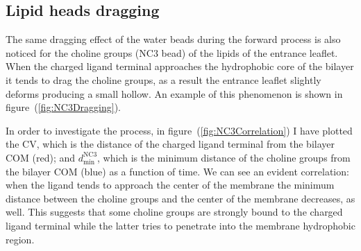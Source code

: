 \subsection{Lipid heads dragging}
The same dragging effect of the water beads during the forward process is also noticed for the choline groups 
(NC$3$ \martini{} bead) of the lipids of the entrance leaflet. When the charged ligand terminal approaches the 
hydrophobic core of the bilayer it tends to drag the choline groups, as a result the entrance leaflet slightly 
deforms producing a small hollow. An example of this phenomenon is shown in figure~(\ref{fig:NC3Dragging}).

In order to investigate the process, in figure~(\ref{fig:NC3Correlation}) I have plotted the \ac{CV}, which is the 
distance of the charged ligand terminal from the bilayer \ac{COM} (red); and $d_\text{min}^{\text{NC}3}$, which is 
the minimum distance of the choline groups from the bilayer \ac{COM} (blue) as a function of time. We can see an 
evident correlation: when the ligand tends to approach the center of the membrane the minimum distance between the 
choline groups and the center of the membrane decreases, as well. This suggests that some choline groups are 
strongly bound to the charged ligand terminal while the latter tries to penetrate into the membrane hydrophobic 
region.
